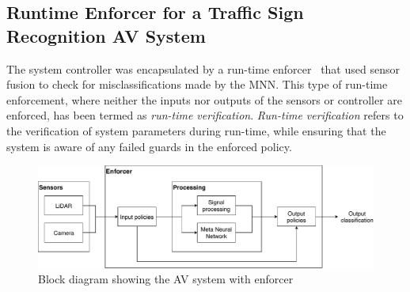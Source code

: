 \subsection{Runtime Enforcer for a Traffic Sign Recognition AV System}
The system controller was encapsulated by a run-time enforcer~\cite{recps} that used sensor fusion to check for misclassifications made by the \ac{MNN}.
This type of run-time enforcement, where neither the inputs nor outputs of the sensors or controller are enforced, has been termed as \textit{run-time verification}.
\textit{Run-time verification} refers to the verification of system parameters during run-time, while ensuring that the system is aware of any failed guards in the enforced policy.

\begin{figure}[h]
	\centering
	\includegraphics[scale=0.6]{Content/fig/SSNN.pdf}
	\caption{Block diagram showing the \acf{AV} system with enforcer}
	\label{fig:ssnn}
\end{figure}






















